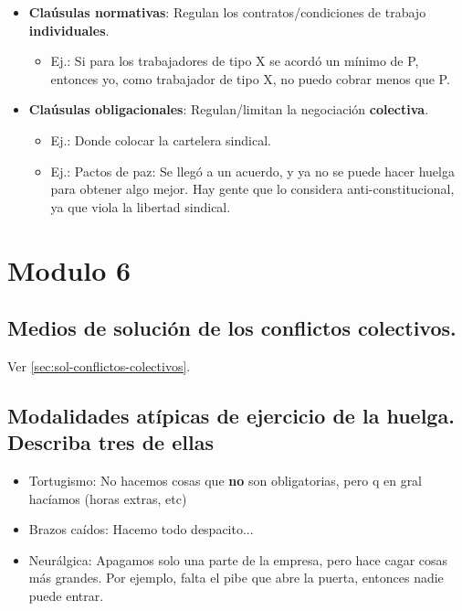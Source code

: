 \documentclass[spanish,12pt,a4paper,titlepage]{report}
\begin{document}
\begin{itemize}
\item \textbf{Claúsulas normativas}: Regulan los contratos/condiciones de trabajo \textbf{individuales}.
  \begin{itemize}
  \item Ej.: Si para los trabajadores de tipo X se acordó un mínimo de P, entonces yo, como trabajador de tipo X, no puedo cobrar menos que P.
  \end{itemize}
\item \textbf{Claúsulas obligacionales}: Regulan/limitan la negociación \textbf{colectiva}.
  \begin{itemize}
  \item Ej.: Donde colocar la cartelera sindical.
  \item Ej.: Pactos de paz: Se llegó a un acuerdo, y ya no se puede hacer huelga para obtener algo mejor. Hay gente que lo considera anti-constitucional, ya que viola la libertad sindical.
  \end{itemize}
\end{itemize}

\section{Modulo 6}

\subsection{Medios de solución de los conflictos colectivos.}

Ver \ref{sec:sol-conflictos-colectivos}.

\subsection{Modalidades atípicas de ejercicio de la huelga. Describa tres de ellas}

\begin{itemize}
\item Tortugismo: No hacemos cosas que \textbf{no} son obligatorias, pero q en gral hacíamos (horas extras, etc)
\item Brazos caídos: Hacemo todo despacito...
\item Neurálgica: Apagamos solo una parte de la empresa, pero hace cagar cosas más grandes. Por ejemplo, falta el pibe que abre la puerta, entonces nadie puede entrar.
\end{itemize}
\end{document}
